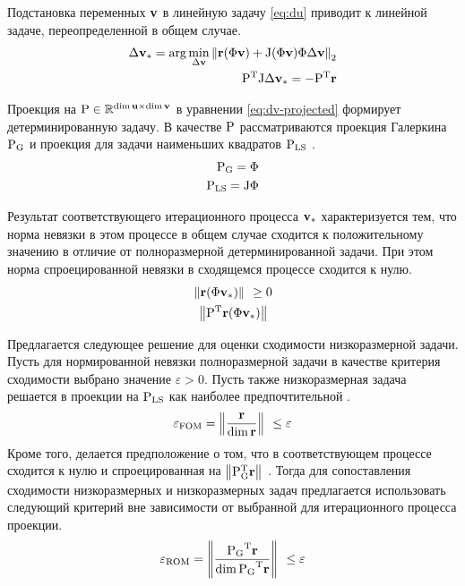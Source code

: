 Подстановка переменных $\mathbf{v}$ в линейную задачу \ref{eq:du} приводит к линейной задаче, переопределенной в общем случае.
\begin{align}
    \dvunk_\ast = \arg \min_{\dvunk} \norm[2]{\resid(\Phi \vunk) + \jac(\Phi \vunk) \Phi \dvunk} \\
    \transpose{P}\jac \dvunk_\ast = - \transpose{P} \resid \label{eq:dv-projected}
\end{align}

Проекция на $\matr{P} \in \mathbb{R}^{\dim \unk \times \dim \vunk}$ в уравнении \ref{eq:dv-projected} формирует детерминированную задачу.
В качестве $\matr{P}$ рассматриваются проекция Галеркина $\matr{P}_\text{G}$ и проекция для задачи наименьших квадратов $\matr{P}_\text{LS}$ \todo{\cite{}}.
\begin{align}
    \matr{P}_\text{G} = \Phi \\
    \matr{P}_\text{LS} = \jac \Phi \\
\end{align}

Результат соответствующего итерационного процесса $\mathbf{v}_\ast$ характеризуется тем, что норма невязки в этом процессе в общем случае сходится к положительному значению в отличие от полноразмерной детерминированной задачи. При этом норма спроецированной невязки в сходящемся процессе сходится к нулю.
\begin{align}
    \norm{\resid(\Phi \vunk_\ast)} \geq 0\\
    \norm{\transpose{P}\resid(\Phi \vunk_\ast)}
\end{align}

Предлагается следующее решение для оценки сходимости низкоразмерной задачи.
Пусть для нормированной невязки полноразмерной задачи в качестве критерия сходимости выбрано значение $\varepsilon > 0$. Пусть также низкоразмерная задача решается в проекции на $\matr{P}_{\text{LS}}$ как наиболее предпочтительной \todo{\cite{}}.
\begin{equation}
    \varepsilon_\text{FOM} = \left\| \frac{\mathbf{r}}{\dim{\mathbf{r}}} \right\|_{~} \leq \varepsilon \\
\end{equation}
Кроме того, делается предположение о том, что в соответствующем процессе сходится к нулю и спроецированная на $\norm{\transpose{P}_\text{G}\resid}$. Тогда для сопоставления сходимости низкоразмерных и низкоразмерных задач предлагается использовать следующий критерий вне зависимости от выбранной для итерационного процесса проекции.
\begin{equation}
    \varepsilon_\text{ROM} = \norm{\frac{\transpose{\matr{P}_\text{G}}\resid}{\dim{ \transpose{\matr{P}_\text{G}}\resid}}} \leq \varepsilon
\end{equation}

